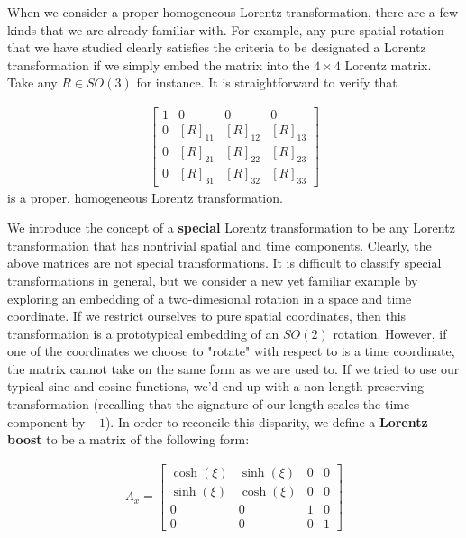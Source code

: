 \documentclass[10pt]{ucthesis}
\begin{document}
When we consider a proper homogeneous Lorentz transformation, there are a few kinds that we are already familiar with. For example, any pure spatial rotation that we have studied clearly satisfies the criteria to be designated a Lorentz transformation if we simply embed the matrix into the $4\times 4$ Lorentz matrix. Take any $R\in SO(3)$ for instance. It is straightforward to verify that 

\begin{equation}
\begin{aligned}
\begin{bmatrix}
	1&0&0&0\\
	0&[R]_{11}&[R]_{12}&[R]_{13}\\
	0&[R]_{21}&[R]_{22}&[R]_{23}\\
	0&[R]_{31}&[R]_{32}&[R]_{33}
\end{bmatrix}
\end{aligned}
\end{equation}
is a proper, homogeneous Lorentz transformation.

We introduce the concept of a \textbf{special} Lorentz transformation to be any Lorentz transformation that has nontrivial spatial and time components. Clearly, the above matrices are not special transformations. It is difficult to classify special transformations in general, but we consider a new yet familiar example by exploring an embedding of a two-dimesional rotation in a space and time coordinate. If we restrict ourselves to pure spatial coordinates, then this transformation is a prototypical embedding of an $SO(2)$ rotation. However, if one of the coordinates we choose to "rotate" with respect to is a time coordinate, the matrix cannot take on the same form as we are used to. If we tried to use our typical sine and cosine functions, we'd end up with a non-length preserving transformation (recalling that the signature of our length scales the time component by $-1$). In order to reconcile this disparity, we define a \textbf{Lorentz boost} to be a matrix of the following form:

\begin{equation}
\begin{aligned}
	\Lambda_x = \begin{bmatrix}
						\cosh(\xi) & \sinh(\xi) & 0 & 0 \\
						\sinh(\xi) & \cosh(\xi) & 0 & 0 \\
						0&0&1&0\\
						0&0&0&1
					\end{bmatrix}
\end{aligned}
\end{equation}
\end{document}
